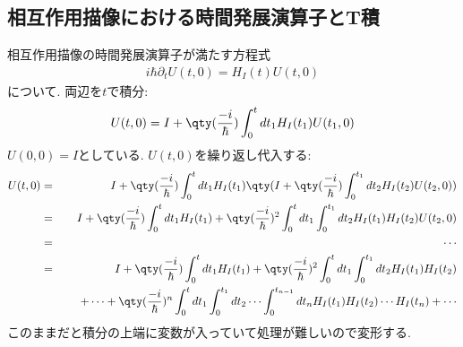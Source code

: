 \documentclass[10.5pt,a4paper]{jreport}
\begin{document}
\subsection{相互作用描像における時間発展演算子とT積}
相互作用描像の時間発展演算子が満たす方程式
\begin{eqnarray}
  i\hbar\partial_tU(t, 0)= H_I(t)U(t, 0)
\end{eqnarray}
について. 両辺を$t$で積分:
\begin{eqnarray}
  U(t, 0) = I + \qty(\frac{-i}{\hbar})\int_0^t dt_1 H_I(t_1)U(t_1, 0)
\end{eqnarray}
$U(0, 0) = I$としている. $U(t, 0)$を繰り返し代入する:
\begin{eqnarray}
  U(t, 0) &=& I + \qty(\frac{-i}{\hbar})\int_0^t dt_1 H_I(t_1)\qty(I + \qty(\frac{-i}{\hbar})\int_0^{t_1} dt_2 H_I(t_2)U(t_2, 0))\\
  &=& I + \qty(\frac{-i}{\hbar})\int_0^t dt_1 H_I(t_1) + \qty(\frac{-i}{\hbar})^2\int_0^t dt_1 \int_0^{t_1} dt_2 H_I(t_1)H_I(t_2)U(t_2, 0)\\
  \nonumber  &=& \cdots\\
  \nonumber&=& I + \qty(\frac{-i}{\hbar})\int_0^t dt_1 H_I(t_1) + \qty(\frac{-i}{\hbar})^2\int_0^t dt_1 \int_0^{t_1} dt_2 H_I(t_1)H_I(t_2)\\
  && \hspace{0.5cm}+ \cdots + \qty(\frac{-i}{\hbar})^n\int_0^t dt_1 \int_0^{t_1} dt_2\cdots\int_0^{t_{n-1}} dt_n H_I(t_1)H_I(t_2)\cdots H_I(t_n) + \cdots\label{T-product0}
\end{eqnarray}
このままだと積分の上端に変数が入っていて処理が難しいので変形する.
\end{document}
